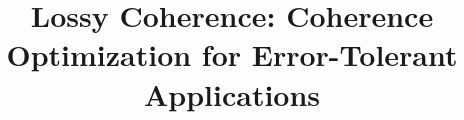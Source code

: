 \documentclass[10pt,journal,compsoc]{IEEEtran}
\begin{document}
%
\title{Lossy Coherence: Coherence Optimization for Error-Tolerant Applications}




% 





\author{




}
\end{document}
